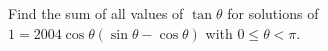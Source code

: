 Find the sum of all values of $\tan\theta$ for solutions of $1=2004\cos\theta(\sin\theta-\cos\theta)$ with $0\le\theta<\pi$.
